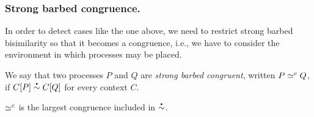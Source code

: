 \documentclass[runningheads]{llncs}
\begin{document}




\subsubsection{Strong barbed congruence.}
In order to detect cases like the one above, we need to restrict strong barbed bisimilarity so that it becomes a congruence,
i.e., %
we have to consider the environment in which processes may be placed.

We say that two processes \( P \) and \( Q \) are \emph{strong barbed congruent}, written \( P \simeq^c Q \), if \( \sbbisim{\applyctx{C}{P}}{\applyctx{C}{Q}} \) for every context \( C \).

\begin{lemma}
  \( \simeq^c \) is the largest congruence included in
  \( \sbbisim{}{} \).
\end{lemma}
\end{document}
